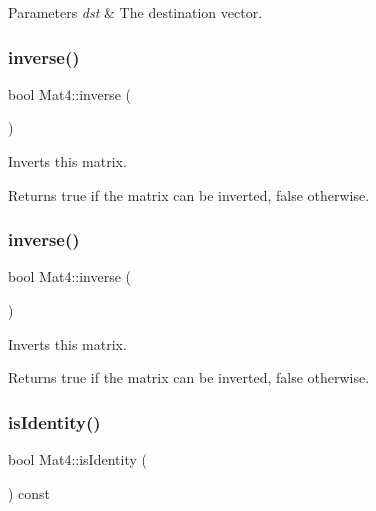 \begin{DoxyParams}{Parameters}
{\em dst} & The destination vector. \\
\hline
\end{DoxyParams}
\mbox{\label{classMat4_a22528a64ce3ee80e93150dea45408e44}} 
\subsubsection{\texorpdfstring{inverse()}{inverse()}\hspace{0.1cm}{\footnotesize\ttfamily [1/2]}}
{\footnotesize\ttfamily bool Mat4\+::inverse (\begin{DoxyParamCaption}{ }\end{DoxyParamCaption})}

Inverts this matrix.

\begin{DoxyReturn}{Returns}
true if the matrix can be inverted, false otherwise. 
\end{DoxyReturn}
\mbox{\label{classMat4_a22528a64ce3ee80e93150dea45408e44}} 
\subsubsection{\texorpdfstring{inverse()}{inverse()}\hspace{0.1cm}{\footnotesize\ttfamily [2/2]}}
{\footnotesize\ttfamily bool Mat4\+::inverse (\begin{DoxyParamCaption}{ }\end{DoxyParamCaption})}

Inverts this matrix.

\begin{DoxyReturn}{Returns}
true if the matrix can be inverted, false otherwise. 
\end{DoxyReturn}
\mbox{\label{classMat4_a3309850f850ef88e57e3b9b17af3371e}} 
\subsubsection{\texorpdfstring{is\+Identity()}{isIdentity()}\hspace{0.1cm}{\footnotesize\ttfamily [1/2]}}
{\footnotesize\ttfamily bool Mat4\+::is\+Identity (\begin{DoxyParamCaption}{ }\end{DoxyParamCaption}) const}

